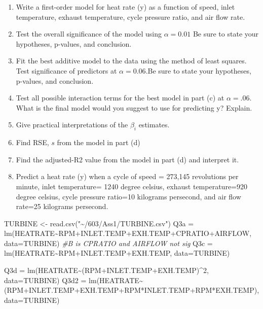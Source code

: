 \documentclass[
]{article}
\newenvironment{Shaded}{\begin{snugshade}}{\end{snugshade}}
\newcommand{\AttributeTok}[1]{\textcolor[rgb]{0.77,0.63,0.00}{#1}}
\newcommand{\CommentTok}[1]{\textcolor[rgb]{0.56,0.35,0.01}{\textit{#1}}}
\newcommand{\DecValTok}[1]{\textcolor[rgb]{0.00,0.00,0.81}{#1}}
\newcommand{\FunctionTok}[1]{\textcolor[rgb]{0.00,0.00,0.00}{#1}}
\newcommand{\NormalTok}[1]{#1}
\newcommand{\OtherTok}[1]{\textcolor[rgb]{0.56,0.35,0.01}{#1}}
\newcommand{\SpecialCharTok}[1]{\textcolor[rgb]{0.00,0.00,0.00}{#1}}
\newcommand{\StringTok}[1]{\textcolor[rgb]{0.31,0.60,0.02}{#1}}
\begin{document}
\begin{enumerate}
\def\labelenumi{(\alph{enumi})}
\item
  Write a first-order model for heat rate (y) as a function of speed,
  inlet temperature, exhaust temperature, cycle pressure ratio, and air
  flow rate.
\item
  Test the overall significance of the model using \(\alpha=0.01\) Be
  sure to state your hypotheses, p-values, and conclusion.
\item
  Fit the best additive model to the data using the method of least
  squares. Test significance of predictors at \(\alpha = 0.06\).Be sure
  to state your hypotheses, p-values, and conclusion.
\item
  Test all possible interaction terms for the best model in part (c) at
  \(\alpha = .06\). What is the final model would you suggest to use for
  predicting y? Explain.
\item
  Give practical interpretations of the \(\beta_i\) estimates.
\item
  Find RSE, \(s\) from the model in part (d)
\item
  Find the adjusted-R2 value from the model in part (d) and interpret
  it.
\item
  Predict a heat rate (y) when a cycle of speed = 273,145 revolutions
  per minute, inlet temperature= 1240 degree celsius, exhaust
  temperature=920 degree celsius, cycle pressure ratio=10 kilograms
  persecond, and air flow rate=25 kilograms persecond.
\end{enumerate}

\begin{Shaded}
\begin{Highlighting}[]
\NormalTok{TURBINE }\OtherTok{\textless{}{-}} \FunctionTok{read.csv}\NormalTok{(}\StringTok{"\textasciitilde{}/603/Ass1/TURBINE.csv"}\NormalTok{)}
\NormalTok{Q3a }\OtherTok{=} \FunctionTok{lm}\NormalTok{(HEATRATE}\SpecialCharTok{\textasciitilde{}}\NormalTok{RPM}\SpecialCharTok{+}\NormalTok{INLET.TEMP}\SpecialCharTok{+}\NormalTok{EXH.TEMP}\SpecialCharTok{+}\NormalTok{CPRATIO}\SpecialCharTok{+}\NormalTok{AIRFLOW, }\AttributeTok{data=}\NormalTok{TURBINE)}
\CommentTok{\#B is CPRATIO and AIRFLOW not sig}
\NormalTok{Q3c }\OtherTok{=} \FunctionTok{lm}\NormalTok{(HEATRATE}\SpecialCharTok{\textasciitilde{}}\NormalTok{RPM}\SpecialCharTok{+}\NormalTok{INLET.TEMP}\SpecialCharTok{+}\NormalTok{EXH.TEMP, }\AttributeTok{data=}\NormalTok{TURBINE)}

\NormalTok{Q3d }\OtherTok{=} \FunctionTok{lm}\NormalTok{(HEATRATE}\SpecialCharTok{\textasciitilde{}}\NormalTok{(RPM}\SpecialCharTok{+}\NormalTok{INLET.TEMP}\SpecialCharTok{+}\NormalTok{EXH.TEMP)}\SpecialCharTok{\^{}}\DecValTok{2}\NormalTok{, }\AttributeTok{data=}\NormalTok{TURBINE)}
\NormalTok{Q3d2 }\OtherTok{=} \FunctionTok{lm}\NormalTok{(HEATRATE}\SpecialCharTok{\textasciitilde{}}\NormalTok{(RPM}\SpecialCharTok{+}\NormalTok{INLET.TEMP}\SpecialCharTok{+}\NormalTok{EXH.TEMP}\SpecialCharTok{+}\NormalTok{RPM}\SpecialCharTok{*}\NormalTok{INLET.TEMP}\SpecialCharTok{+}\NormalTok{RPM}\SpecialCharTok{*}\NormalTok{EXH.TEMP), }\AttributeTok{data=}\NormalTok{TURBINE)}
\end{Highlighting}
\end{Shaded}
\end{document}
